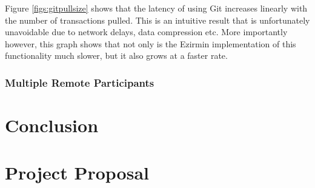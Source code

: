 \documentclass[12pt,a4paper,twoside,openright]{report}
\begin{document}
	Figure \ref{figs:gitpullsize} shows that the latency of using Git increases linearly with the number of transactions pulled.
	This is an intuitive result that is unfortunately unavoidable due to network delays, data compression etc.
	More importantly however, this graph shows that not only is the Ezirmin implementation of this functionality much slower, but it also grows at a faster rate.

	\subsection{Multiple Remote Participants}

	\chapter{Conclusion}
	
	
	
	
	
	\appendix

	\chapter{Project Proposal}
	
	
	
	
\end{document}
